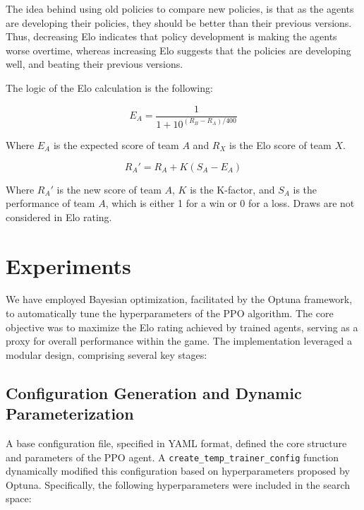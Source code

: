 \documentclass{LSkill}
\begin{document}
The idea behind using old policies to compare new policies, is that as the agents are developing their policies, they should be better than their previous versions. Thus, decreasing Elo indicates that policy development is making the agents worse overtime, whereas increasing Elo suggests that the policies are developing well, and beating their previous versions. 

The logic of the Elo calculation is the following:

\[
E_A = \frac{1}{1 + 10^{(R_B - R_A)/400}}
\]

\par %
Where \(E_A\) is the expected score of team \(A\) and \(R_X\) is the Elo score of team \(X\).

\[
R_A' = R_A + K(S_A - E_A)
\]

\par %
Where \(R_A'\) is the new score of team \(A\), \(K\) is the K-factor, and \(S_A\) is the performance of team \(A\), which is either 1 for a win or 0 for a loss. Draws are not considered in Elo rating.

    

\section{Experiments}

We have employed Bayesian optimization, facilitated by the Optuna framework, to automatically tune the hyperparameters of the PPO algorithm. The core objective was to maximize the Elo rating achieved by trained agents, serving as a proxy for overall performance within the game. The implementation leveraged a modular design, comprising several key stages:

\subsection{Configuration Generation and Dynamic Parameterization}

A base configuration file, specified in YAML format, defined the core structure and parameters of the PPO agent. A \texttt{create\_temp\_trainer\_config} function dynamically modified this configuration based on hyperparameters proposed by Optuna. Specifically, the following hyperparameters were included in the search space:
\end{document}
